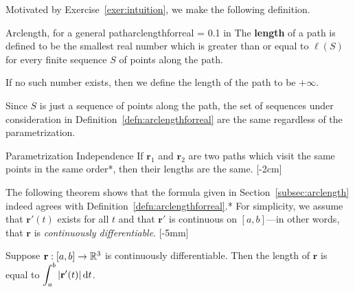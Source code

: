 \documentclass{watsonbook}
\begin{document}
  Motivated by Exercise~\ref{exer:intuition}, we make the following
  definition.  

  \begin{defn}{Arclength, for a general path}{arclengthforreal}
    \parskip = 0.1 in 
    The \textbf{length} of a path is defined to be the smallest real
    number which is greater than or equal to $\ell(S)$ for every
    finite sequence $S$ of points along the path.

    If no such number exists, then we define the length of the path to be
    $+\infty$. 
  \end{defn}
  
  Since $S$ is just a sequence of points along the path, the set of
  sequences under consideration in
  Definition~\ref{defn:arclengthforreal} are the same regardless of the
  parametrization.

  \begin{theo}{Parametrization Independence}{}
    If $\mathbf{r}_1$ and $\mathbf{r}_2$ are two paths which visit the
    same points in the same order*, then their lengths are the
    same. [-2cm]
  \end{theo}

  The following theorem shows that the formula given in
  Section~\ref{subsec:arclength} indeed agrees with
  Definition~\ref{defn:arclengthforreal}.* For simplicity, we assume
  that $\mathbf{r}'(t)$ exists for all $t$ and that $\mathbf{r}'$ is
  continuous on $[a,b]$---in other words, that $\mathbf{r}$ is
  \textit{continuously differentiable}.  [-5mm]
  
  \begin{theo}{}{}
    Suppose $\mathbf{r}:[a,b] \to \mathbb{R}^3$ is continuously
    differentiable. Then the length of $\mathbf{r}$ is equal to
    $\displaystyle{\int_a^b |\mathbf{r}'(t)| \, \mathrm{d}t}$.
  \end{theo}
\end{document}
